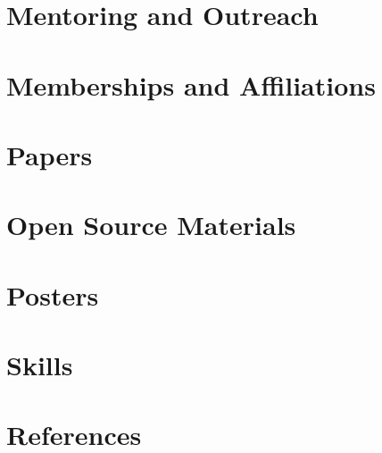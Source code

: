 \documentclass{prometheus_cv}
\begin{document}
% 

\section{Mentoring and Outreach}


\section{Memberships and Affiliations}


% 

\section{Papers}


\section{Open Source Materials}


\section{Posters}


\section{Skills}


\section{References}

\end{document}
